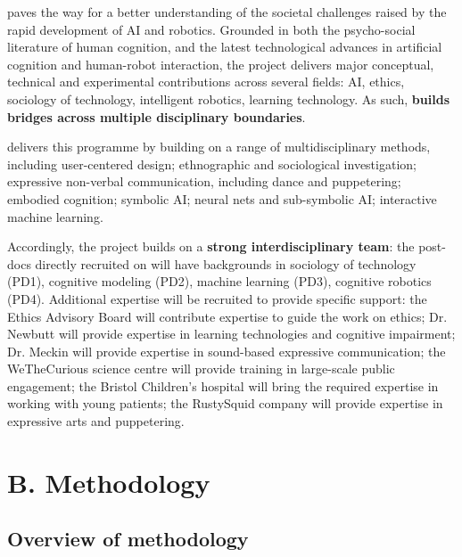 \project paves the way for a better understanding of the societal challenges
raised by the rapid development of AI and robotics. Grounded in both the
psycho-social literature of human cognition, and the latest technological
advances in artificial cognition and human-robot interaction, the project
delivers major conceptual, technical and experimental contributions across
several fields: AI, ethics, sociology of technology, intelligent robotics,
learning technology. As such, \textbf{\project builds bridges across
multiple disciplinary boundaries}.

\project delivers this programme by building on a range of multidisciplinary
methods, including user-centered design; ethnographic and sociological
investigation; expressive non-verbal communication, including dance and
puppetering; embodied cognition; symbolic AI; neural
nets and sub-symbolic AI; interactive machine learning.

Accordingly, the project builds on a \textbf{strong interdisciplinary team}: the
post-docs directly recruited on \project will have backgrounds in sociology of
technology (PD1), cognitive modeling (PD2), machine learning (PD3), cognitive
robotics (PD4). Additional expertise will be recruited to provide specific
support: the \project Ethics Advisory Board will contribute expertise to guide
the work on ethics; Dr. Newbutt will provide expertise in learning technologies
and cognitive impairment; Dr. Meckin will provide expertise in sound-based
expressive communication; the WeTheCurious science centre will provide training
in large-scale public engagement; the Bristol Children's hospital will bring the
required expertise in working with young patients; the RustySquid company will
provide expertise in expressive arts and puppetering.



\newpage
\section{B. Methodology}

\subsection{Overview of \project methodology}

